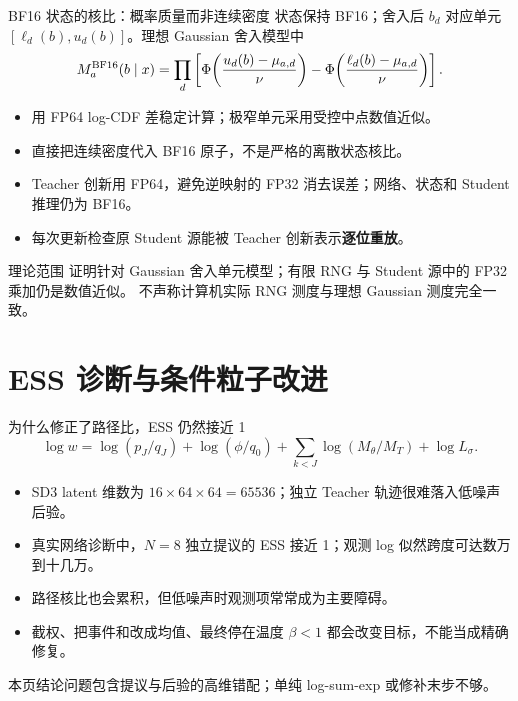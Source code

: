 \documentclass[10pt,aspectratio=169]{beamer}
\newcommand{\takeaway}[1]{\begin{exampleblock}{本页结论}\small #1\end{exampleblock}}
\begin{document}
\begin{frame}{BF16 状态的核比：概率质量而非连续密度}
\small
状态保持 BF16；舍入后 $b_d$ 对应单元 $[\ell_d(b),u_d(b)]$。理想 Gaussian 舍入模型中
\begin{equation}
M_a^{\rm BF16}(b\mid x)=\prod_d\left[
\Phi\!\left(\frac{u_d(b)-\mu_{a,d}}{\nu}\right)
-\Phi\!\left(\frac{\ell_d(b)-\mu_{a,d}}{\nu}\right)\right].
\end{equation}
\begin{itemize}\itemsep4pt
\item 用 FP64 log-CDF 差稳定计算；极窄单元采用受控中点数值近似。
\item 直接把连续密度代入 BF16 原子，不是严格的离散状态核比。
\item Teacher 创新用 FP64，避免逆映射的 FP32 消去误差；网络、状态和 Student 推理仍为 BF16。
\item 每次更新检查原 Student 源能被 Teacher 创新表示\textbf{逐位重放}。
\end{itemize}
\begin{alertblock}{理论范围}
证明针对 Gaussian 舍入单元模型；有限 RNG 与 Student 源中的 FP32 乘加仍是数值近似。
不声称计算机实际 RNG 测度与理想 Gaussian 测度完全一致。
\end{alertblock}
\end{frame}

\section{ESS 诊断与条件粒子改进}
\begin{frame}{为什么修正了路径比，ESS 仍然接近 1}
\small
\begin{equation}
\log w=\log(p_J/q_J)+\log(\phi/q_0)
+\sum_{k<J}\log(M_\theta/M_T)+\log L_\sigma.
\end{equation}
\begin{itemize}\itemsep5pt
\item SD3 latent 维数为 $16\times64\times64=65536$；独立 Teacher 轨迹很难落入低噪声后验。
\item 真实网络诊断中，$N=8$ 独立提议的 ESS 接近 1；观测 log 似然跨度可达数万到十几万。
\item 路径核比也会累积，但低噪声时观测项常常成为主要障碍。
\item 截权、把事件和改成均值、最终停在温度 $\beta<1$ 都会改变目标，不能当成精确修复。
\end{itemize}
\takeaway{问题包含提议与后验的高维错配；单纯 log-sum-exp 或修补末步不够。}
\end{frame}
\end{document}
